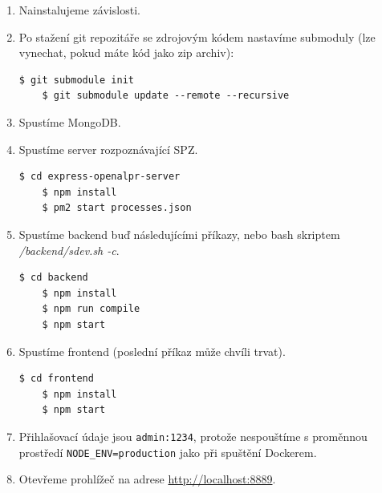 \begin{enumerate}
  \setlength\itemsep{.05em}
  \item Nainstalujeme závislosti.
  \item Po stažení git repozitáře se zdrojovým kódem nastavíme submoduly (lze vynechat, pokud máte kód jako zip archiv):\\
  \begin{lstlisting}[numbers=none]
    $ git submodule init
    $ git submodule update --remote --recursive
  \end{lstlisting}
  \item Spustíme MongoDB.
  \item Spustíme server rozpoznávající SPZ.\\
  \begin{lstlisting}[numbers=none]
    $ cd express-openalpr-server
    $ npm install
    $ pm2 start processes.json
  \end{lstlisting}
  \item Spustíme backend buď následujícími příkazy, nebo bash skriptem \textit{/backend/sdev.sh -c}.\\
  \begin{lstlisting}[numbers=none]
    $ cd backend
    $ npm install
    $ npm run compile
    $ npm start
  \end{lstlisting}
  \item Spustíme frontend (poslední příkaz může chvíli trvat).\\
  \begin{lstlisting}[numbers=none]
    $ cd frontend
    $ npm install
    $ npm start
  \end{lstlisting}
  \item Přihlašovací údaje jsou \texttt{admin:1234}, protože nespouštíme s proměnnou prostředí \texttt{NODE\_ENV=production} jako při spuštění Dockerem.
  \item Otevřeme prohlížeč na adrese \url{http://localhost:8889}.
\end{enumerate}
